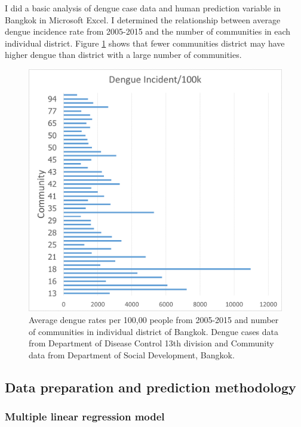 \documentclass[review]{elsarticle}
\begin{document}
I did a basic analysis of dengue case data and human prediction variable in Bangkok in Microsoft Excel. I determined the relationship between average dengue incidence rate  from 2005-2015 and the number of communities in each individual district. Figure \ref{figure-dengue_community_vs_cases} shows that fewer communities district may have higher dengue than district with a large number of communities.


\begin{figure}[htbp]
	\begin{center}
		\includegraphics[width=120mm]{./figures/dengue_community_vs_cases}
		\caption{ Average dengue rates per 100,00 people from 2005-2015 and number of communities in individual district of Bangkok.  Dengue cases data from Department of Disease Control 13th division and Community data from Department of Social Development, Bangkok.}
		\label{figure-dengue_community_vs_cases}
	\end{center}
\end{figure}








\subsection{Data preparation and prediction methodology}
\label{section-Prediction-model-method}


\subsubsection{Multiple linear regression model}
\label{section-linear-regression-model}
\end{document}

